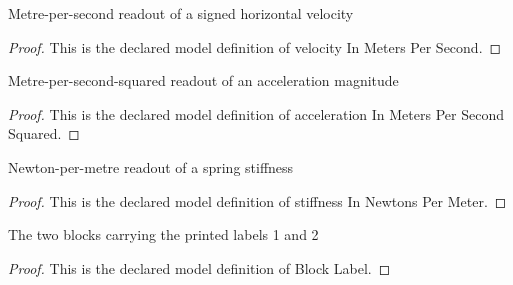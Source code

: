 \begin{definition}
  \label{def:physics:phyx-mini-0255:phyxminiproblems-problemphyxmini0255-velocityinmeterspersecond}
  Metre-per-second readout of a signed horizontal velocity
\end{definition}
\begin{proof}
  This is the declared model definition of velocity In Meters Per Second.
\end{proof}
\begin{definition}
  \label{def:physics:phyx-mini-0255:phyxminiproblems-problemphyxmini0255-accelerationinmeterspersecondsquared}
  Metre-per-second-squared readout of an acceleration magnitude
\end{definition}
\begin{proof}
  This is the declared model definition of acceleration In Meters Per Second Squared.
\end{proof}
\begin{definition}
  \label{def:physics:phyx-mini-0255:phyxminiproblems-problemphyxmini0255-stiffnessinnewtonspermeter}
  Newton-per-metre readout of a spring stiffness
\end{definition}
\begin{proof}
  This is the declared model definition of stiffness In Newtons Per Meter.
\end{proof}
\begin{definition}
  \label{def:physics:phyx-mini-0255:phyxminiproblems-problemphyxmini0255-blocklabel}
  The two blocks carrying the printed labels 1 and 2
\end{definition}
\begin{proof}
  This is the declared model definition of Block Label.
\end{proof}
